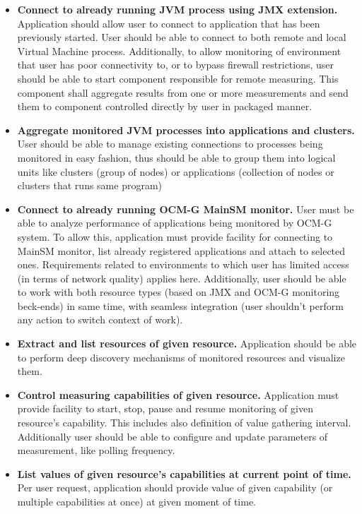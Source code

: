 \begin{itemize}

\item {\bf Connect to already running JVM process using JMX extension.} 
Application should allow user to connect to application that has been previously started. User should be able to connect to both remote and local Virtual Machine process. Additionally, to allow monitoring of environment that user has poor connectivity to, or to bypass firewall restrictions, user should be able to start component responsible for remote measuring. This component shall aggregate results from one or more measurements and send them to component controlled directly by user in packaged manner.

\item {\bf Aggregate monitored JVM processes into applications and clusters.}
User should be able to manage existing connections to processes being monitored in easy fashion, thus should be able to group them into logical units like clusters (group of nodes) or applications (collection of nodes or clusters that runs same program)

\item {\bf Connect to already running OCM-G MainSM monitor.}
User must be able to analyze performance of applications being monitored by OCM-G system. To allow this, application must provide facility for connecting to MainSM monitor, list already registered applications and attach to selected ones. Requirements related to environments to which user has limited access (in terms of network quality) applies here. Additionally, user should be able to work with both resource types (based on JMX and OCM-G monitoring beck-ends) in same time, with seamless integration (user shouldn't perform any action to switch context of work).

\item {\bf Extract and list resources of given resource.}
Application should be able to perform deep discovery mechanisms of monitored resources and visualize them.

\item {\bf Control measuring capabilities of given resource.}
Application must provide facility to start, stop, pause and resume monitoring of given resource's capability. This includes also definition of value gathering interval. Additionally user should be able to configure and update parameters of measurement, like polling frequency. 

\item {\bf List values of given resource's capabilities at current point of time.}
Per user request, application should provide value of given capability (or multiple capabilities at once) at given moment of time.


\end{itemize}
